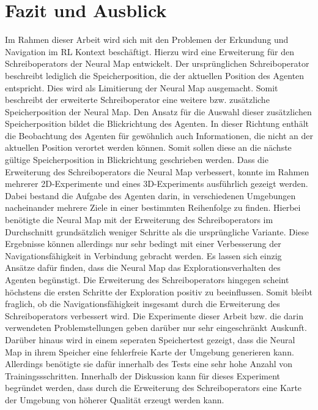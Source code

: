 \chapter{Fazit und Ausblick}

Im Rahmen dieser Arbeit wird sich mit den Problemen der Erkundung und Navigation im RL Kontext beschäftigt. Hierzu wird eine Erweiterung für den Schreiboperators der Neural Map entwickelt. Der ursprünglichen Schreiboperator beschreibt lediglich die Speicherposition, die der aktuellen Position des Agenten entspricht. Dies wird als Limitierung der Neural Map ausgemacht. Somit beschreibt der erweiterte Schreiboperator eine weitere bzw. zusätzliche Speicherposition der Neural Map. Den Ansatz für die Auswahl dieser zusätzlichen Speicherposition bildet die Blickrichtung des Agenten. In dieser Richtung enthält die Beobachtung des Agenten für gewöhnlich auch Informationen, die nicht an der aktuellen Position verortet werden können. Somit sollen diese an die nächste gültige Speicherposition in Blickrichtung geschrieben werden. Dass die Erweiterung des Schreiboperators die Neural Map verbessert, konnte im Rahmen mehrerer 2D-Experimente und eines 3D-Experiments ausführlich gezeigt werden. Dabei bestand die Aufgabe des Agenten darin, in verschiedenen Umgebungen nacheinander mehrere Ziele in einer bestimmten Reihenfolge zu finden. Hierbei benötigte die Neural Map mit der Erweiterung des Schreiboperators im Durchschnitt grundsätzlich weniger Schritte als die ursprüngliche Variante. Diese Ergebnisse können allerdings nur sehr bedingt mit einer Verbesserung der Navigationsfähigkeit in Verbindung gebracht werden. Es lassen sich einzig Ansätze dafür finden, dass die Neural Map das Explorationsverhalten des Agenten begünstigt. Die Erweiterung des Schreiboperators hingegen scheint höchstens die ersten Schritte der Exploration positiv zu beeinflussen. Somit bleibt fraglich, ob die Navigationsfähigkeit insgesamt durch die Erweiterung des Schreiboperators verbessert wird. Die Experimente dieser Arbeit bzw. die darin verwendeten Problemstellungen geben darüber nur sehr eingeschränkt Auskunft. Darüber hinaus wird in einem seperaten Speichertest gezeigt, dass die Neural Map in ihrem Speicher eine fehlerfreie Karte der Umgebung generieren kann. Allerdings benötigte sie dafür innerhalb des Tests eine sehr hohe Anzahl von Trainingssschritten. Innerhalb der Diskussion kann für dieses Experiment begründet werden, dass durch die Erweiterung des Schreiboperators eine Karte der Umgebung von höherer Qualität erzeugt werden kann.

